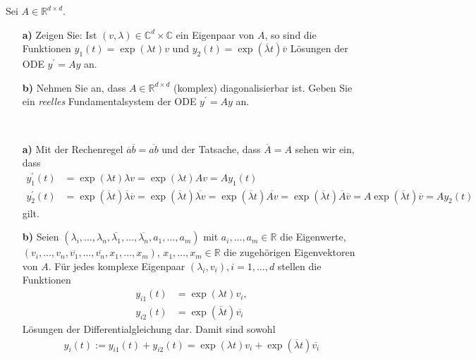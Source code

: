 \begin{exercise}
Sei $A \in \mathbb{R}^{d\times d}$.
\begin{itemize}
  \item [\textbf{a)}]Zeigen Sie: Ist $(v,\lambda) \in \mathbb{C}^d
  \times \mathbb{C}$ ein Eigenpaar von $A$, so sind die Funktionen
  $y_1(t) = \exp(\lambda t)v$ und $y_2(t) = \exp(\overline{\lambda}t)\overline{v}$
  Lösungen der ODE $y^{\prime} = Ay$ an.
  \item [\textbf{b)}] Nehmen Sie an, dass $A \in \mathbb{R}^
  {d \times d}$ (komplex) diagonalisierbar ist. Geben Sie ein
  \textit{reelles} Fundamentalsystem der ODE $y^{\prime} = Ay$ an.
\end{itemize}
\end{exercise}
\begin{solution}
\leavevmode \\
\begin{itemize}
  \item [\textbf{a)}]
  Mit der Rechenregel $\overline{a}\overline{b} = \overline{ab}$ und der Tatsache, dass $\overline{A} = A$
  sehen wir ein, dass
  \begin{align*}
    y_1^{\prime}(t) &= \exp(\lambda t)\lambda v = \exp(\lambda t)A v = Ay_1(t) \\
    y_2^{\prime}(t) &= \exp(\overline{\lambda}t)\overline{\lambda}\overline{v} = \exp(\overline{\lambda}t) \overline{\lambda v} =
    \exp(\overline{\lambda}t) \overline{Av} =  \exp(\overline{\lambda}t) \overline{A}\overline{v} = A\exp(\overline{\lambda}t)\overline{v} = Ay_2(t)
  \end{align*}
  gilt.
  \item [\textbf{b)}]
  Seien $(\lambda_i,\dots,\lambda_n,\overline{\lambda_1},\dots,\overline{\lambda_n},a_1,\dots,a_m)$
  mit $a_i,\dots,a_m \in \mathbb{R}$ die Eigenwerte, \\
  $(v_i,\dots,v_n,\overline{v_1},\dots,\overline{v_n},x_1,\dots,x_m)$, $x_1,\dots,x_m \in \mathbb{R}$
  die zugehörigen Eigenvektoren von $A$.
  Für jedes komplexe Eigenpaar $(\lambda_i, v_i), i = 1,\dots,d$ stellen die Funktionen
  \begin{align*}
    y_{i1}(t) &= \exp(\lambda t)v_i, \\
    y_{i2}(t) &= \exp(\overline{\lambda} t)\overline{v_i}
  \end{align*}
  Lösungen der Differentialgleichung dar. Damit sind sowohl
  \begin{align*}
    y_i(t) := y_{i1}(t) + y_{i2}(t) = \exp(\lambda t)v_i + \exp(\overline{\lambda} t)\overline{v_i}

\end{align*}
\end{itemize}
\end{solution}
